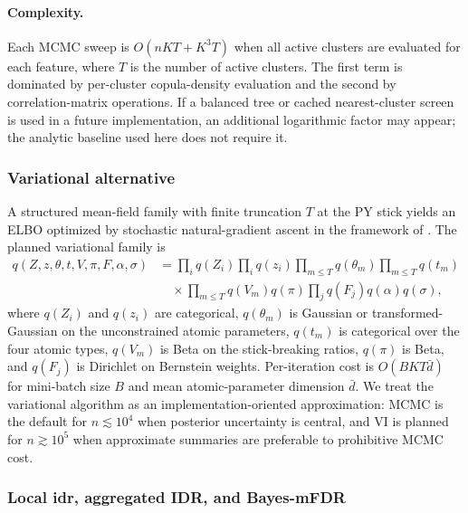 \paragraph{Complexity.}
Each MCMC sweep is $O(nKT+K^3T)$ when all active clusters are evaluated for each feature, where $T$ is the number of active clusters. The first term is dominated by per-cluster copula-density evaluation and the second by correlation-matrix operations. If a balanced tree or cached nearest-cluster screen is used in a future implementation, an additional logarithmic factor may appear; the analytic baseline used here does not require it.

\subsubsection{Variational alternative}
\label{sec:vi}

A structured mean-field family with finite truncation $T$ at the PY stick yields an ELBO optimized by stochastic natural-gradient ascent in the framework of \citet{HoffmanBleiWangPaisley2013}. The planned variational family is
\begin{align*}
q(Z,z,\theta,t,V,\pi,F,\alpha,\sigma)
&=\prod_i q(Z_i)\prod_i q(z_i)\prod_{m\leq T}q(\theta_m)\prod_{m\leq T}q(t_m)\\
&\quad\times\prod_{m\leq T}q(V_m)q(\pi)\prod_j q(F_j)q(\alpha)q(\sigma),
\end{align*}
where $q(Z_i)$ and $q(z_i)$ are categorical, $q(\theta_m)$ is Gaussian or transformed-Gaussian on the unconstrained atomic parameters, $q(t_m)$ is categorical over the four atomic types, $q(V_m)$ is Beta on the stick-breaking ratios, $q(\pi)$ is Beta, and $q(F_j)$ is Dirichlet on Bernstein weights. Per-iteration cost is $O(BKT\bar d)$ for mini-batch size $B$ and mean atomic-parameter dimension $\bar d$. We treat the variational algorithm as an implementation-oriented approximation: MCMC is the default for $n\lesssim10^4$ when posterior uncertainty is central, and VI is planned for $n\gtrsim10^5$ when approximate summaries are preferable to prohibitive MCMC cost.

\subsubsection{Local idr, aggregated IDR, and Bayes-mFDR}

